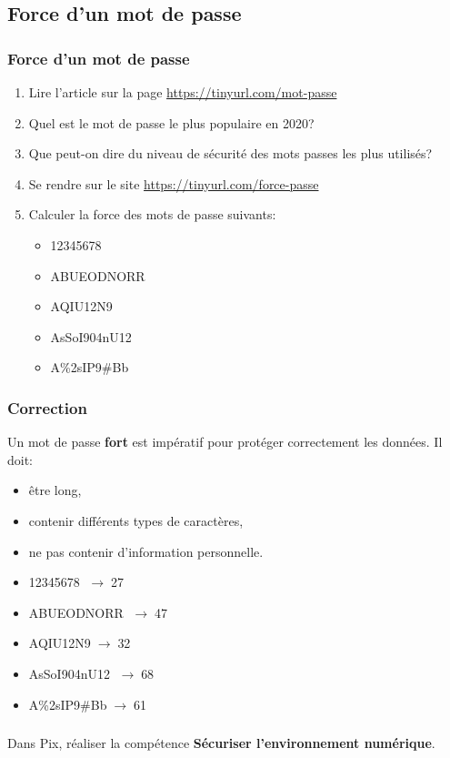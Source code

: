 \documentclass[svgnames,11pt]{beamer}
\begin{document}
\subsection{Force d'un mot de passe}
\begin{frame}
    \frametitle{Force d'un mot de passe}

    \begin{activite}
        \begin{enumerate}
        \item Lire l'article sur la page \url{https://tinyurl.com/mot-passe}
        \item Quel est le mot de passe le plus populaire en 2020?
        \item Que peut-on dire du niveau de sécurité des mots passes les plus utilisés?
        \item Se rendre sur le site \url{https://tinyurl.com/force-passe}
        \item Calculer la force des mots de passe suivants:
        \begin{itemize}
        \item 12345678
        \item ABUEODNORR
        \item AQIU12N9
        \item AsSoI904nU12
        \item A\%2sIP9\#Bb
        \end{itemize}
        \end{enumerate}
        \end{activite}

\end{frame}
\begin{frame}
    \frametitle{Correction}
\begin{aretenir}[]
Un mot de passe \textbf{fort} est impératif pour protéger correctement les données. Il doit:
\begin{itemize}
    \item être long,
    \item contenir différents types de caractères,
    \item ne pas contenir d'information personnelle.
\end{itemize}
\end{aretenir}
    
    \begin{itemize}
        \item 12345678 $\;\rightarrow\;$27
        \item ABUEODNORR $\;\rightarrow\;$47
        \item AQIU12N9$\;\rightarrow\;$32
        \item AsSoI904nU12 $\;\rightarrow\;$68
        \item A\%2sIP9\#Bb$\;\rightarrow\;$61
        \end{itemize}
\end{frame}
\begin{frame}
    \frametitle{}

    \begin{activite}
        Dans Pix, réaliser la compétence \textbf{Sécuriser l'environnement numérique}.
        \end{activite}

\end{frame}
\end{document}
